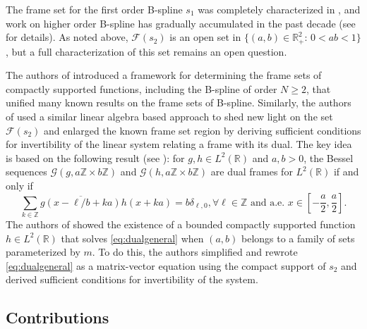 \documentclass{article}
\newcommand{\R}{\mathbb{R}}
\newcommand{\Z}{\mathbb{Z}}
\newcommand{\frameset}{\ensuremath{\mathcal{F}}}
\begin{document}
The frame set for the first order B-spline $s_1$ was completely
characterized in \cite{dai2016abc}, and work on higher order
B-spline has gradually accumulated in the past decade (see
\cite{AtiKouOko1} \cite{atindehou2023frame} \cite{Olehon} \cite{Olehon1}
\cite{Ole4} \cite{ghosh2025gabor} \cite{ghosh2023obstructions} 
\cite{Grojan} \cite{Lemniel} \cite{Kloosto} for details). As noted above,
 \(\frameset(s_2)\) is an open set in $\{(a, b) \in \R^2_+: \, 0<ab<1\}$ \cite{FeiKai04},
but a full characterization of this set remains an open question. 


The authors of \cite{AtiKouOko1} introduced a framework for
determining the frame sets of compactly supported functions, including
the B-spline of order \(N \geq 2\), that unified many known results
on the frame sets of B-spline. Similarly, the authors of  \cite{atindehou2023frame} 
used a similar linear algebra based approach to shed new light
on the set \(\frameset(s_2)\) and enlarged the known frame set region by
deriving sufficient conditions for invertibility of the linear system
relating a frame with its dual. The key idea is based on the following result (see \cite[Theorem
2.10]{Ole1}): for \(g,h \in L^2(\R)\) and \(a,b > 0\), the Bessel
sequences \(\mathcal{G}(g, a\Z \times b\Z)\) and \(\mathcal{G}(h, a\Z \times
b\Z)\) are dual frames for \(L^2(\R)\) if and only if
\begin{equation}\label{eq:dualgeneral}
	\sum_{k \in \Z} \overline{g(x-\ell/b+ka)} h(x+ka) =
		b\delta_{\ell,0}, \forall \ell \in \Z \mbox{ and a.e. } x \in
		\left[-\frac{a}{2},\frac{a}{2}\right].
\end{equation}
The authors of \cite{atindehou2023frame} showed the existence of a
bounded compactly supported function \(h \in L^2(\R)\) that solves
\eqref{eq:dualgeneral} when \((a,b)\) belongs to a family of sets
parameterized by \(m\). To do this, the authors simplified and rewrote
\eqref{eq:dualgeneral} as a matrix-vector equation using the compact
support of \(s_2\) and derived sufficient conditions for invertibility
of the system.






\subsection{Contributions}
\end{document}
